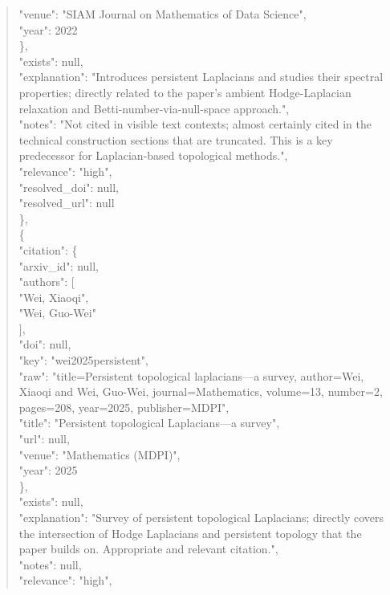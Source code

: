 \documentclass[11pt]{article}
\begin{document}
\begin{quote}
        "venue": "SIAM Journal on Mathematics of Data Science",\\
        "year": 2022\\
      \},\\
      "exists": null,\\
      "explanation": "Introduces persistent Laplacians and studies their spectral properties; directly related to the paper's ambient Hodge-Laplacian relaxation and Betti-number-via-null-space approach.",\\
      "notes": "Not cited in visible text contexts; almost certainly cited in the technical construction sections that are truncated. This is a key predecessor for Laplacian-based topological methods.",\\
      "relevance": "high",\\
      "resolved\_doi": null,\\
      "resolved\_url": null\\
    \},\\
    \{\\
      "citation": \{\\
        "arxiv\_id": null,\\
        "authors": [\\
          "Wei, Xiaoqi",\\
          "Wei, Guo-Wei"\\
        ],\\
        "doi": null,\\
        "key": "wei2025persistent",\\
        "raw": "title=Persistent topological laplacians---a survey, author=Wei, Xiaoqi and Wei, Guo-Wei, journal=Mathematics, volume=13, number=2, pages=208, year=2025, publisher=MDPI",\\
        "title": "Persistent topological Laplacians---a survey",\\
        "url": null,\\
        "venue": "Mathematics (MDPI)",\\
        "year": 2025\\
      \},\\
      "exists": null,\\
      "explanation": "Survey of persistent topological Laplacians; directly covers the intersection of Hodge Laplacians and persistent topology that the paper builds on. Appropriate and relevant citation.",\\
      "notes": null,\\
      "relevance": "high",\\

\end{quote}
\end{document}
